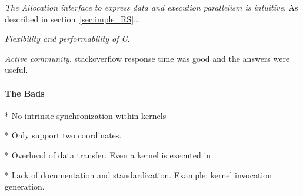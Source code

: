 \textit{The Allocation interface to express data and execution parallelism is
intuitive}. As described in section~\ref{sec:imple_RS}...

\textit{Flexibility and performability of C}.

\textit{Active community}. stackoverflow response time was good and the answers
were useful.

\paragraph{The Bads}

* No intrinsic synchronization within kernels

* Only support two coordinates.

* Overhead of data transfer. Even a kernel is executed in 

* Lack of documentation and standardization. Example: kernel invocation generation.


